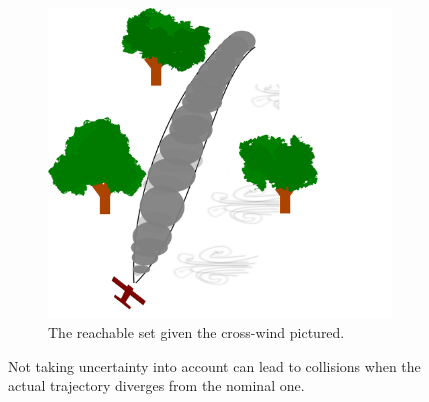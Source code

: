 \begin{figure}
\begin{subfigure}{0.5\textwidth}
    \includegraphics[width=\textwidth]{figures/experiments/experiment-setup-funnel}
    \caption{The reachable set given the cross-wind pictured.}
  \end{subfigure}
  \caption{Not taking uncertainty into account can lead to collisions when the
    actual trajectory diverges from the nominal one.}
\end{figure}


